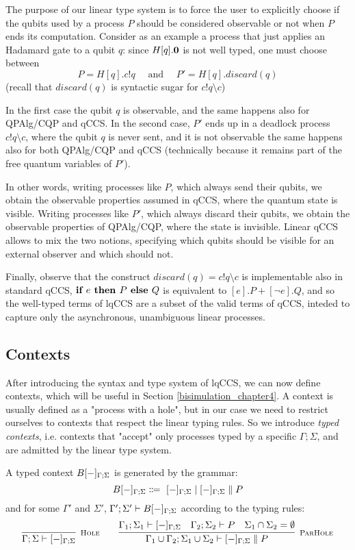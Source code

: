 The purpose of our linear type system is to force the user to explicitly choose if the qubits used by a process $P$ should be considered  observable or not when $P$ ends its computation. Consider as an example a process that just applies an Hadamard gate  to a qubit $q$: since $H[q].\mathbf{0}$ is not well typed, one must choose between 
\[ P = H[q].c!q \quad\text{ and }\quad P' = H[q].discard(q)
\]
(recall that $discard(q)$ is syntactic sugar for $c!q\setminus c$)

In the first case the qubit $q$ is observable, and the same happens also for QPAlg/CQP and qCCS. In the second case, $P'$ ends up in a deadlock process $c!q \setminus c$, where the qubit $q$ is never sent, and it is not observable the same happens also for both QPAlg/CQP and qCCS (technically because it remains part of the free quantum variables of $P'$). 

In other words, writing processes like $P$, which always send their qubits, we obtain the observable properties assumed in qCCS, where the quantum state is visible. Writing processes like $P'$, which always discard their qubits, we obtain the observable properties of QPAlg/CQP, where the state is invisible. Linear qCCS allows to mix the two notions, specifying which qubits should be visible for an external observer and which should not.

Finally, observe that the construct $discard(q) = c!q \setminus c$ is implementable also in standard qCCS, $\textbf{if } e \textbf{ then } P \textbf{ else } Q$ is equivalent to $[e].P + [\neg e].Q$, and so the well-typed terms of lqCCS are a subset of the valid terms of qCCS, inteded to capture only the asynchronous, unambiguous linear processes.

\subsection{Contexts}
After introducing the syntax and type system of lqCCS, we can now define contexts, which will be useful in Section \ref{bisimulation_chapter4}. A context is usually defined as a "process with a hole", but in our case we need to restrict ourselves to contexts that respect the linear typing rules. So we introduce \textit{typed contexts}, i.e. contexts that "accept" only processes typed by a specific $\Gamma;\Sigma$, and are admitted by the linear type system.

\begin{definition}
A typed context $B[{-}]_{\Gamma; \Sigma}$ is generated by the grammar:
\[
B[\blank]_{\Gamma; \Sigma} \Coloneqq \ [\blank]_{\Gamma; \Sigma} \mid [\blank]_{\Gamma; \Sigma} \parallel P
\]
and for some $\Gamma'$ and $\Sigma'$, $\Gamma';\Sigma' \vdash B[{-}]_{\Gamma; \Sigma}$ according to the typing rules:
\[
  \infer[\mbox{\footnotesize\scshape Hole}]{\Gamma; \Sigma \vdash [\blank]_{\Gamma; \Sigma}}{}
\qquad
\infer[\mbox{\footnotesize\scshape ParHole}]{\Gamma_1 \cup \Gamma_2; \Sigma_1 \cup \Sigma_2 \vdash [\blank]_{\Gamma; \Sigma} \parallel P}
{\Gamma_1; \Sigma_1 \vdash [\blank]_{\Gamma; \Sigma} & \Gamma_2; \Sigma_2 \vdash P & \Sigma_1 \cap \Sigma_2 = \emptyset}
\]
\end{definition}

